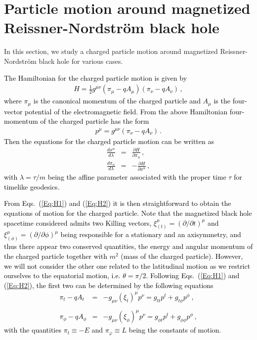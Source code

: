 \documentclass[showpacs,twocolumn,superscriptaddress]{revtex4}
\begin{document}
\section{Particle motion around magnetized Reissner-Nordstr\"{o}m black hole } \label{Sec:Motion} 

In this section, we study a charged particle motion around magnetized Reissner-Nordstr\"{o}m black hole for various cases. 

\textcolor{black}{The Hamiltonian for the charged particle motion is given by \cite{Misner73}
\begin{eqnarray}
H=\frac{1}{2}g^{\mu\nu} \left(\pi_{\mu}-qA_{\mu}\right)\left(\pi_{\nu}-qA_{\nu}\right)\, ,
\end{eqnarray}
where $\pi_{\mu}$ is the canonical momentum of the charged particle and $A_{\mu}$ is the four-vector potential of the electromagnetic field. From the above Hamiltonian four-momentum of the charged particle has the form   
\begin{eqnarray}
p^{\mu}=g^{\mu\nu}\left(\pi_{\nu}-qA_{\nu}\right)\, . 
\end{eqnarray}
Then the equations for the charged particle motion can be written as 
\begin{eqnarray} 
\label{Eq:H1}
  \frac{dx^\alpha}{d\lambda} &=& \frac{\partial H}{\partial \pi_\alpha}\, ,  \\
  \frac{d\pi_\alpha}{d\lambda} &=& - \frac{\partial H}{\partial x^\alpha}\, , \label{Eq:H2}
\end{eqnarray}
%
with $\lambda=\tau/m$ being the affine parameter associated with the proper time $\tau$ for
timelike geodesics. }

\textcolor{black}{From Eqs.~(\ref{Eq:H1}) and (\ref{Eq:H2}) it is then  straightforward to obtain the equations of motion for the charged particle. Note that
the magnetized black hole spacetime considered admits two Killing vectors, $\xi^{\mu}_{(t)}=(\partial/\partial t)^{\mu}$ and
$\xi^{\mu}_{(\phi)}=(\partial/\partial \phi)^{\mu}$ being responsible for a stationary and an axisymmetry, 
and thus there appear two conserved quantities, the energy and angular momentum of the charged particle together with $m^2$ (mass of the charged particle). However, we will not consider the other one related to the latitudinal motion as we restrict ourselves to the equatorial motion, i.e. $\theta=\pi/2$. Following Eqs.~(\ref{Eq:H1}) and (\ref{Eq:H2}), the first two can be determined by the following equations
%
\begin{eqnarray}
\label{En1} \pi_t-qA_{t}&=& -g_{\mu\nu}(\xi_{t})^{\mu}p^{\nu}=
g_{tt}p^{t} + g_{t\phi}p^{\phi}\ ,\\
\nonumber\\
 \label{Ln1}
\pi_{\phi}-qA_{\phi}&=& -g_{\mu\nu}(\xi_{\phi})^{\mu}p^{\nu}=g_{\phi t}p^{t} +
g_{\phi\phi}p^{\phi}\, ,
%
\end{eqnarray}
%
with the quantities $\pi_t\equiv -E$ and $ \pi_{\varphi} \equiv L $ being the constants of motion.}
\end{document}
